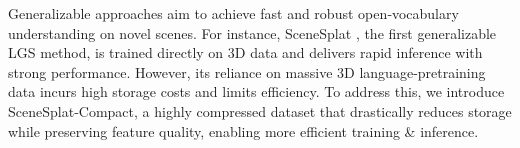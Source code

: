 \documentclass[runningheads]{llncs}
\begin{document}
Generalizable approaches aim to achieve fast and robust open‑vocabulary understanding on novel scenes. For instance, SceneSplat \cite{li2025scenesplat}, the first generalizable LGS method, is trained directly on 3D data and delivers rapid inference with strong performance. However, its reliance on massive 3D language‑pretraining data incurs high storage costs and limits efficiency. To address this, we introduce SceneSplat‑Compact, a highly compressed dataset that drastically reduces storage while preserving feature quality, enabling more efficient training \& inference.
\end{document}
